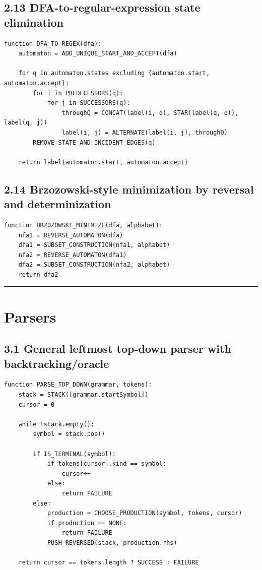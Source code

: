 \documentclass[10pt,letterpaper]{article}
\begin{document}
\subsection*{2.13 DFA-to-regular-expression state elimination}

\begin{verbatim}
function DFA_TO_REGEX(dfa):
    automaton = ADD_UNIQUE_START_AND_ACCEPT(dfa)

    for q in automaton.states excluding {automaton.start, automaton.accept}:
        for i in PREDECESSORS(q):
            for j in SUCCESSORS(q):
                throughQ = CONCAT(label(i, q), STAR(label(q, q)), label(q, j))
                label(i, j) = ALTERNATE(label(i, j), throughQ)
        REMOVE_STATE_AND_INCIDENT_EDGES(q)

    return label(automaton.start, automaton.accept)
\end{verbatim}

\subsection*{2.14 Brzozowski-style minimization by reversal and determinization}

\begin{verbatim}
function BRZOZOWSKI_MINIMIZE(dfa, alphabet):
    nfa1 = REVERSE_AUTOMATON(dfa)
    dfa1 = SUBSET_CONSTRUCTION(nfa1, alphabet)
    nfa2 = REVERSE_AUTOMATON(dfa1)
    dfa2 = SUBSET_CONSTRUCTION(nfa2, alphabet)
    return dfa2
\end{verbatim}

\medskip\hrule\medskip

\clearpage
\section{Parsers}

\subsection*{3.1 General leftmost top-down parser with backtracking/oracle}

\begin{verbatim}
function PARSE_TOP_DOWN(grammar, tokens):
    stack = STACK([grammar.startSymbol])
    cursor = 0

    while !stack.empty():
        symbol = stack.pop()

        if IS_TERMINAL(symbol):
            if tokens[cursor].kind == symbol:
                cursor++
            else:
                return FAILURE
        else:
            production = CHOOSE_PRODUCTION(symbol, tokens, cursor)
            if production == NONE:
                return FAILURE
            PUSH_REVERSED(stack, production.rhs)

    return cursor == tokens.length ? SUCCESS : FAILURE
\end{verbatim}
\end{document}
